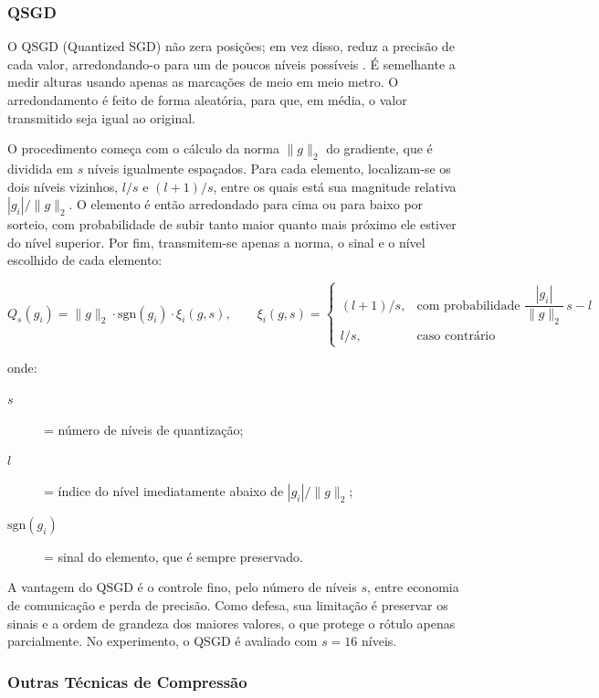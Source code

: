 \subsubsection{QSGD}

O QSGD (Quantized SGD) não zera posições; em vez disso, reduz a precisão de cada valor, arredondando-o para um de poucos níveis possíveis \cite{Alistarh2017}. É semelhante a medir alturas usando apenas as marcações de meio em meio metro. O arredondamento é feito de forma aleatória, para que, em média, o valor transmitido seja igual ao original.

O procedimento começa com o cálculo da norma $\|g\|_2$ do gradiente, que é dividida em $s$ níveis igualmente espaçados. Para cada elemento, localizam-se os dois níveis vizinhos, $l/s$ e $(l+1)/s$, entre os quais está sua magnitude relativa $|g_i|/\|g\|_2$. O elemento é então arredondado para cima ou para baixo por sorteio, com probabilidade de subir tanto maior quanto mais próximo ele estiver do nível superior. Por fim, transmitem-se apenas a norma, o sinal e o nível escolhido de cada elemento:

\begin{equation} \label{eq:qsgd}
Q_s(g_i) = \|g\|_2 \cdot \mathrm{sgn}(g_i) \cdot \xi_i(g, s), \qquad
\xi_i(g, s) =
\begin{cases}
(l+1)/s, & \text{com probabilidade } \dfrac{|g_i|}{\|g\|_2}\, s - l \\[2mm]
l/s, & \text{caso contrário}
\end{cases}
\end{equation}

\noindent onde:
\begin{description}
  \item[$s$] = número de níveis de quantização;
  \item[$l$] = índice do nível imediatamente abaixo de $|g_i|/\|g\|_2$;
  \item[$\mathrm{sgn}(g_i)$] = sinal do elemento, que é sempre preservado.
\end{description}

A vantagem do QSGD é o controle fino, pelo número de níveis $s$, entre economia de comunicação e perda de precisão. Como defesa, sua limitação é preservar os sinais e a ordem de grandeza dos maiores valores, o que protege o rótulo apenas parcialmente. No experimento, o QSGD é avaliado com $s = 16$ níveis.

\subsubsection{Outras Técnicas de Compressão}

